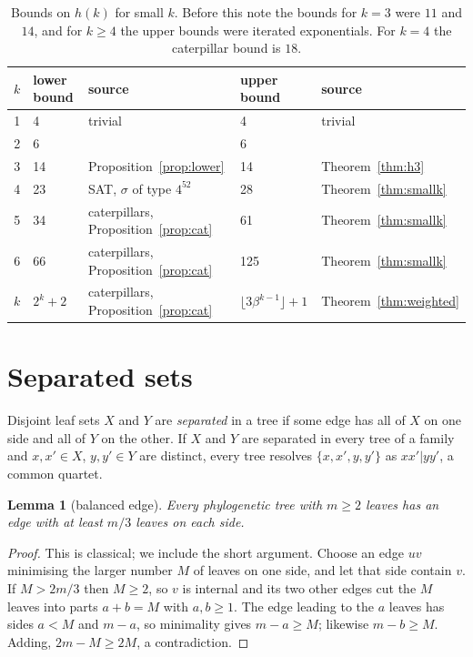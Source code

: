 \documentclass[11pt]{amsart}
\newtheorem{lemma}[theorem]{Lemma}
\theoremstyle{remark}
\begin{document}
\begin{table}[ht]
\centering
\begin{tabular}{rllll}
\toprule
$k$ & lower bound & source & upper bound & source \\
\midrule
1 & 4 & trivial & 4 & trivial \\
2 & 6 & \cite{BD1986} & 6 & \cite{BD1986} \\
3 & 14 & Proposition~\ref{prop:lower} & 14 & Theorem~\ref{thm:h3} \\
4 & 23 & SAT, $\sigma$ of type $4^52$ & 28 & Theorem~\ref{thm:smallk} \\
5 & 34 & caterpillars, Proposition~\ref{prop:cat} & 61 & Theorem~\ref{thm:smallk} \\
6 & 66 & caterpillars, Proposition~\ref{prop:cat} & 125 & Theorem~\ref{thm:smallk} \\
$k$ & $2^k+2$ & caterpillars, Proposition~\ref{prop:cat} & $\lfloor3\beta^{k-1}\rfloor+1$ & Theorem~\ref{thm:weighted} \\
\bottomrule
\end{tabular}
\caption{Bounds on $h(k)$ for small $k$. Before this note the bounds for $k=3$ were $11$ and $14$, and for $k\ge4$ the upper bounds were iterated exponentials. For $k=4$ the caterpillar bound is $18$.}
\label{tab:small}
\end{table}

\section{Separated sets}\label{sec:sep}

Disjoint leaf sets $X$ and $Y$ are \emph{separated} in a tree if some edge has all of $X$ on one side and all of $Y$ on the other. If $X$ and $Y$ are separated in every tree of a family and $x,x'\in X$, $y,y'\in Y$ are distinct, every tree resolves $\{x,x',y,y'\}$ as $xx'|yy'$, a common quartet.

\begin{lemma}[balanced edge]\label{lem:centroid}
Every phylogenetic tree with $m\ge2$ leaves has an edge with at least $m/3$ leaves on each side.
\end{lemma}

\begin{proof}
This is classical; we include the short argument. Choose an edge $uv$ minimising the larger number $M$ of leaves on one side, and let that side contain $v$. If $M>2m/3$ then $M\ge2$, so $v$ is internal and its two other edges cut the $M$ leaves into parts $a+b=M$ with $a,b\ge1$. The edge leading to the $a$ leaves has sides $a<M$ and $m-a$, so minimality gives $m-a\ge M$; likewise $m-b\ge M$. Adding, $2m-M\ge2M$, a contradiction.
\end{proof}
\end{document}
